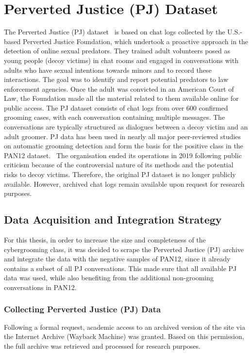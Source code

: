 \section{Perverted Justice (PJ) Dataset}
The Perverted Justice (PJ) dataset~\cite{pj} is based on chat logs collected by the U.S.-based Perverted Justice Foundation, which undertook a proactive approach in the detection of online sexual predators. They trained adult volunteers posed as young people (decoy victims) in chat rooms and engaged in conversations with adults who have sexual intentions towards minors and to record these interactions. The goal was to identify and report potential predators to law enforcement agencies. Once the adult was convicted in an American Court of Law, the Foundation made all the material related to them available online for public access. The PJ dataset consists of chat logs from over 600 confirmed grooming cases, with each conversation containing multiple messages. The conversations are typically structured as dialogues between a decoy victim and an adult groomer. PJ data has been used in nearly all major peer-reviewed studies on automatic grooming detection and form the basis for the positive class in the PAN12 dataset.~\cite{inches2012pan} 
The organisation ended its operations in 2019 following public criticism because of the controversial nature of its methods and the potential risks to decoy victims. Therefore, the original PJ dataset is no longer publicly available. However, archived chat logs remain available upon request for research purposes.~\cite{pj}

\subsection{Data Acquisition and Integration Strategy}

For this thesis, in order to increase the size and completeness of the cybergrooming class, it was decided to scrape the Perverted Justice (PJ) archive and integrate the data with the negative samples of PAN12, since it already contains a subset of all PJ conversations. This made sure that all available PJ data was used, while also benefiting from the additional non-grooming conversations in PAN12.

\subsubsection{Collecting Perverted Justice (PJ) Data}

Following a formal request, academic access to an archived version of the site via the Internet Archive (Wayback Machine) was granted. Based on this permission, the full archive was retrieved and processed for research purposes.

